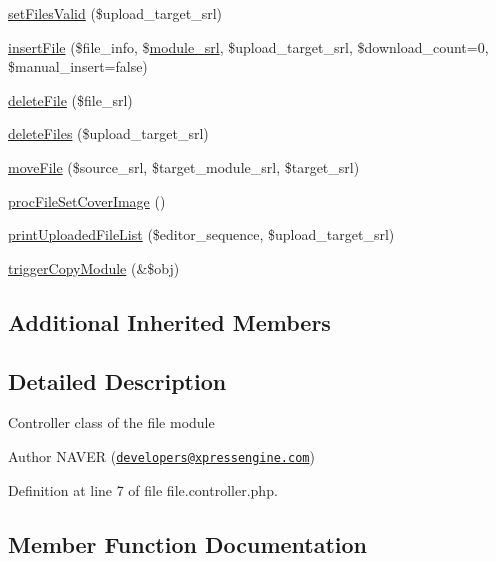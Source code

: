 \begin{DoxyCompactItemize}
\item 
\hyperlink{classfileController_a801efe17bf09b43279f82504b748c5ee}{set\+Files\+Valid} (\$upload\+\_\+target\+\_\+srl)
\item 
\hyperlink{classfileController_aa9247b382342e097dcd71dac7b944c50}{insert\+File} (\$file\+\_\+info, \$\hyperlink{ko_8install_8php_a370bb6450fab1da3e0ed9f484a38b761}{module\+\_\+srl}, \$upload\+\_\+target\+\_\+srl, \$download\+\_\+count=0, \$manual\+\_\+insert=false)
\item 
\hyperlink{classfileController_a98775c010ad21e88fd590c0a35b9c405}{delete\+File} (\$file\+\_\+srl)
\item 
\hyperlink{classfileController_ae3060e078930eeaae0c939d7a1c4f229}{delete\+Files} (\$upload\+\_\+target\+\_\+srl)
\item 
\hyperlink{classfileController_aae914224f7bc02d907004c3fb1dd29ac}{move\+File} (\$source\+\_\+srl, \$target\+\_\+module\+\_\+srl, \$target\+\_\+srl)
\item 
\hyperlink{classfileController_a54e65e695efa22b2a9507fd52e44d601}{proc\+File\+Set\+Cover\+Image} ()
\item 
\hyperlink{classfileController_a99cefbd1c15aeb48b68903e77f9041c7}{print\+Uploaded\+File\+List} (\$editor\+\_\+sequence, \$upload\+\_\+target\+\_\+srl)
\item 
\hyperlink{classfileController_a043759003f14e91db0f4fb554955fba8}{trigger\+Copy\+Module} (\&\$obj)
\end{DoxyCompactItemize}
\subsection*{Additional Inherited Members}


\subsection{Detailed Description}
Controller class of the file module \begin{DoxyAuthor}{Author}
N\+A\+V\+ER (\href{mailto:developers@xpressengine.com}{\tt developers@xpressengine.\+com}) 
\end{DoxyAuthor}


Definition at line 7 of file file.\+controller.\+php.



\subsection{Member Function Documentation}
\hypertarget{classfileController_a98775c010ad21e88fd590c0a35b9c405}{}\label{classfileController_a98775c010ad21e88fd590c0a35b9c405} 

